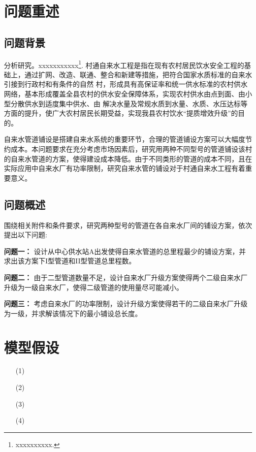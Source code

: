 \documentclass{whutmod}
\newcommand{\upcite}[1]{\textsuperscript{\cite{#1}}}
\begin{document}
	\thispagestyle{empty}
	\tableofcontents
	\setcounter{page}{0}                                               
	\newpage	%
	

	
	\section{问题重述}	
		\subsection{问题背景}
	    	分析研究\upcite{1}。xxxxxxxxxxx\footnote{\quad xxxxxxxxxx.}.
	村通自来水工程是指在现有农村居民饮水安全工程的基础上，通过扩网、改造、联通、整合和新建等措施，把符合国家水质标准的自来水引接到行政村和有条件的自然 村，形成具有高保证率和统一供水标准的农村供水网络，基本形成覆盖全县农村的供水安全保障体系，实现农村供水由点到面、由小型分散供水到适度集中供水、由 解决水量及常规水质到水量、水质、水压达标等方面的提升，使广大农村居民长期受益，实现我县农村饮水“提质增效升级”的目的。
	
	自来水管道铺设是搭建自来水系统的重要环节，合理的管道铺设方案可以大幅度节约成本。本问题要求在充分考虑市场因素后，研究用两种不同型号的管道铺设该村的自来水管道的方案，使得建设成本降低。由于不同类形的管道的成本不同，且在实际应用中自来水厂有功率限制，研究自来水管的铺设对于村通自来水工程有着重要意义。
	
		\subsection{问题概述}
		    围绕相关附件和条件要求，研究两种型号的管道在各自来水厂间的铺设方案，依次提出以下问题:
		    
			\textbf{问题一：}
			设计从中心供水站A出发使得自来水管道的总里程最少的铺设方案，并求出该方案下I型管道和II型管道总里程数。
			
			\textbf{问题二：}
			由于二型管道数量不足，设计自来水厂升级方案使得两个二级自来水厂升级为一级自来水厂，使得二级管道的使用量尽可能减小。
			
			\textbf{问题三：}
            考虑自来水厂的功率限制，设计升级方案使得若干的二级自来水厂升级为一级，并求解该情况下的最小铺设总长度。
	
	\section{模型假设}
		\begin{itemize}                                             
		\item [(1)] 
		\item [(2)]
		\item [(3)] 
		\item [(4)] 
		\end{itemize}
\end{document}
